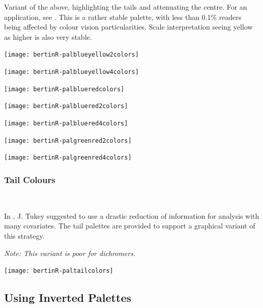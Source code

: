 \documentclass[nogin, dvips,12pt,a4paper,twoside]{amsart}
\begin{document}
Variant of the above, highlighting the tails and  attenuating the centre. For an application, see . This is a rather stable palette, with less than 0.1\% readers being affected by colour vision particularities. Scale interpretation seeing yellow as higher is also very stable.

\texttt{[image: bertinR-palblueyellow2colors]}


\texttt{[image: bertinR-palblueyellow4colors]}


\clearpage

\texttt{[image: bertinR-palblueredcolors]}



\texttt{[image: bertinR-palbluered2colors]}


\texttt{[image: bertinR-palbluered4colors]}


\clearpage
\texttt{[image: bertinR-palgreenred2colors]}


\texttt{[image: bertinR-palgreenred4colors]}


\clearpage

\subsubsection{Tail Colours}\ 

In \cite{tukey1991manycovar}, J. Tukey suggested to use a drastic reduction of information for analysis with many covariates. The tail palettes are provided to support a graphical variant of this strategy.

{\em{Note: This variant is poor for dichromers.}}


\texttt{[image: bertinR-paltailcolors]}

\clearpage


\subsection{Using Inverted Palettes}
\end{document}
